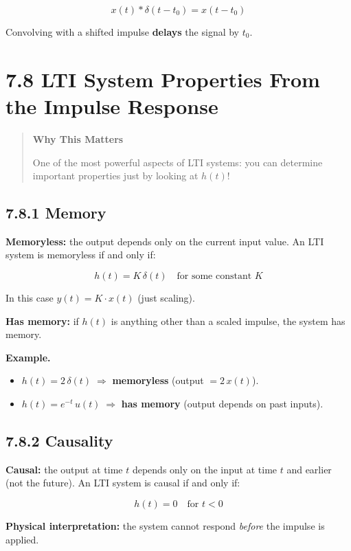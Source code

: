\documentclass[11pt]{article}
\begin{document}
\[x(t)*\delta(t - t_0) = x(t - t_0)\]

Convolving with a shifted impulse \textbf{delays} the signal by $t_0$.

\section*{7.8 LTI System Properties From the Impulse Response}

\begin{quote}
\textbf{Why This Matters}

One of the most powerful aspects of LTI systems: you can determine important properties just by looking at $h(t)$!
\end{quote}

\subsection*{7.8.1 Memory}

\textbf{Memoryless:} the output depends only on the current input value. An LTI system is memoryless if and only if:

\[h(t) = K\,\delta(t)\quad\text{for some constant } K\]

In this case $y(t) = K\cdot x(t)$ (just scaling).

\textbf{Has memory:} if $h(t)$ is anything other than a scaled impulse, the system has memory.

\textbf{Example.}

\begin{itemize}
  \item $h(t) = 2\,\delta(t)\;\Rightarrow$ \textbf{memoryless} (output $= 2\,x(t)$).
  \item $h(t) = e^{-t}\,u(t)\;\Rightarrow$ \textbf{has memory} (output depends on past inputs).
\end{itemize}

\subsection*{7.8.2 Causality}

\textbf{Causal:} the output at time $t$ depends only on the input at time $t$ and earlier (not the future). An LTI system is causal if and only if:

\[\boxed{\;h(t) = 0\quad\text{for }t<0\;}\]

\textbf{Physical interpretation:} the system cannot respond \textit{before} the impulse is applied.
\end{document}
